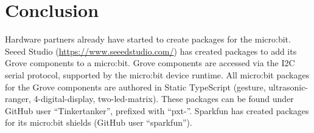 \section{Conclusion}
\label{sec:conclude}

Hardware partners already have started to create \MC packages for the micro:bit.
Seeed Studio (\url{https://www.seeedstudio.com/}) has created packages to add its Grove components to a micro:bit.
Grove components are accessed via the I2C serial protocol, supported by the micro:bit device runtime.
All micro:bit packages for the Grove components are authored in Static TypeScript (gesture, ultrasonic-ranger,
4-digital-display, two-led-matrix). These packages can be found under GitHub user ``Tinkertanker'', prefixed with
``pxt-''. Sparkfun has created \MC packages for its micro:bit shields (GitHub user ``sparkfun'').

